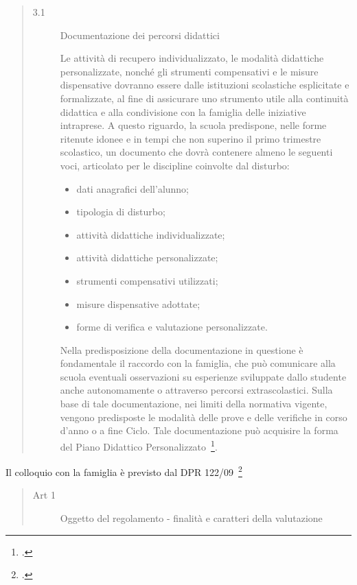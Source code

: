 \begin{quote}
\begin{description}
	\item[3.1] Documentazione dei percorsi didattici
	
	 	Le attività di recupero individualizzato, le modalità didattiche personalizzate, nonché gli
	 	strumenti compensativi e le misure dispensative dovranno essere dalle istituzioni scolastiche
	 	esplicitate e formalizzate, al fine di assicurare uno strumento utile alla continuità didattica e alla
	 	condivisione con la famiglia delle iniziative intraprese.
	 	A questo riguardo, la scuola predispone, nelle forme ritenute idonee e in tempi che non
	 	superino il primo trimestre scolastico, un documento che dovrà contenere almeno le seguenti voci,
	 	articolato per le discipline coinvolte dal disturbo:
	 	\begin{itemize}
	 		\item dati anagrafici dell'alunno; 
	 		\item tipologia di disturbo;
	 		\item attività didattiche individualizzate;
	 		\item attività didattiche personalizzate;
	 		\item strumenti compensativi utilizzati;
	 		\item misure dispensative adottate;
	 		\item forme di verifica e valutazione personalizzate.
	 	\end{itemize}
	 	Nella predisposizione della documentazione in questione è fondamentale il raccordo con la famiglia, che può comunicare alla scuola eventuali osservazioni su esperienze sviluppate dallo studente anche autonomamente o attraverso percorsi extrascolastici. Sulla base di tale documentazione, nei limiti della normativa vigente, vengono predisposte le modalità delle prove e delle verifiche in corso d'anno o a fine Ciclo. Tale documentazione può acquisire la forma del Piano Didattico Personalizzato~\footcite{LineGuida2011}.
\end{description}
\end{quote}
Il colloquio con la famiglia è previsto dal DPR 122/09~\footcite{DPR_122_2009}
\begin{quote}
\begin{description}
	\item[Art 1] Oggetto del regolamento - finalità e caratteri della valutazione
\end{description}
\end{quote}
